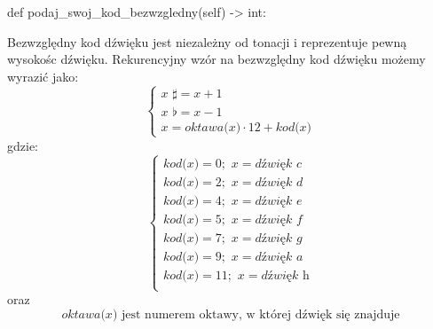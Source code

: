 \documentclass[dokumentacja.tex]{subfiles}
\begin{document}
\begin{itemize}
        \begin{python}
        def podaj_swoj_kod_bezwzgledny(self) -> int:
        \end{python}
        \nopagebreak
        Bezwzględny kod dźwięku jest niezależny od tonacji i reprezentuje pewną wysokośc dźwięku. Rekurencyjny wzór na bezwzględny kod dźwięku możemy wyrazić jako:
        \[
            \begin{cases}
                \textit{x } \sharp = \textit{x} + 1 \\
                \textit{x } \flat= \textit{x} - 1 \\
                \textit{x} = \textit{oktawa(x)} \cdot 12 + \textit{kod(x)}
            \end{cases}
            \]
            gdzie:
            \[
            \begin{cases}
                \textit{kod(x)} = 0; \textit{  x} = \textit{dźwięk c} \\
                \textit{kod(x)} = 2; \textit{  x} = \textit{dźwięk d} \\
                \textit{kod(x)} = 4; \textit{  x} = \textit{dźwięk e} \\
                \textit{kod(x)} = 5; \textit{  x} = \textit{dźwięk f} \\
                \textit{kod(x)} = 7; \textit{  x} = \textit{dźwięk g} \\
                \textit{kod(x)} = 9; \textit{  x} = \textit{dźwięk a} \\
                \textit{kod(x)} = 11; \textit{  x} = \textit{dźwięk h} \\
            \end{cases}
            \]
            oraz
            \begin{equation}
                \textit{oktawa(x)} \text{ jest numerem oktawy, w której dźwięk się znajduje}
            \end{equation}
            
    
\end{itemize}
\end{document}
